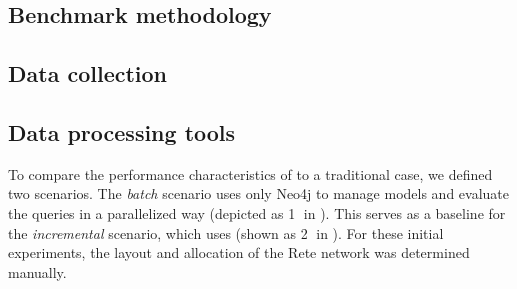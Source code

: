 \subsection{Benchmark methodology}

\subsection{Data collection}

\subsection{Data processing tools}

To compare the performance characteristics of \iqd{} to a traditional case, we defined two scenarios. The \textit{batch} scenario uses only Neo4j to manage models and evaluate the queries in a parallelized way (depicted as \textcircled{1} in ). This serves as a baseline for the \textit{incremental} scenario, which uses \iqd{} (shown as \textcircled{2} in ). For these initial experiments, the layout and allocation of the Rete network was determined manually. 
